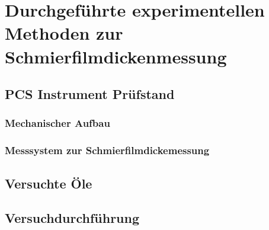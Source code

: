 \chapter{Durchgeführte experimentellen Methoden zur Schmierfilmdickenmessung}
\label{chap:durchgefuehrte_experimentellen_methoden}

\section{PCS Instrument Prüfstand}
\label{sec:pcs_pruefstand}

\subsection{Mechanischer Aufbau}
\label{ssec:mechanischer_aufbau}

\subsection{Messsystem zur Schmierfilmdickemessung}
\label{ssec:messsystem_zur_schmierfilmdickemessung}

\section{Versuchte Öle}
\label{sec:versuchte_oele}

\section{Versuchdurchführung}
\label{sec:versuchdurchfuehrung}
